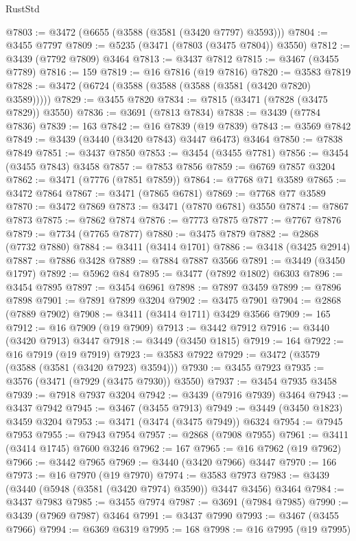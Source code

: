 \begin{lexlean}{RustStd}
\begin{coremodule}
{{{{{{{{{{{{{{{{{{{@7803 := @3472 (@6655 (@3588 (@3581 (@3420 @7797) @3593)))
@7804 := @3455 @7797
@7809 := @5235 (@3471 (@7803 (@3475 @7804)) @3550)
@7812 := @3439 (@7792 @7809) @3464
@7813 := @3437 @7812
@7815 := @3467 (@3455 @7789)
@7816 := 159
@7819 := @16 @7816 (@19 @7816)
@7820 := @3583 @7819
@7828 := @3472 (@6724 (@3588 (@3588 (@3588 (@3581 (@3420 @7820) @3589)))))
@7829 := @3455 @7820
@7834 := @7815 (@3471 (@7828 (@3475 @7829)) @3550)
@7836 := @3691 (@7813 @7834)
@7838 := @3439 (@7784 @7836)
@7839 := 163
@7842 := @16 @7839 (@19 @7839)
@7843 := @3569 @7842
@7849 := @3439 (@3440 (@3420 @7843) @3447 @6473) @3464
@7850 := @7838 @7849
@7851 := @3437 @7850
@7853 := @3454 (@3455 @7781)
@7856 := @3454 (@3455 @7843) @3458
@7857 := @7853 @7856
@7859 := @6769 @7857 @3204
@7862 := @3471 (@7776 (@7851 @7859))
@7864 := @7768 @71 @3589
@7865 := @3472 @7864
@7867 := @3471 (@7865 @6781)
@7869 := @7768 @77 @3589
@7870 := @3472 @7869
@7873 := @3471 (@7870 @6781) @3550
@7874 := @7867 @7873
@7875 := @7862 @7874
@7876 := @7773 @7875
@7877 := @7767 @7876
@7879 := @7734 (@7765 @7877)
@7880 := @3475 @7879
@7882 := @2868 (@7732 @7880)
@7884 := @3411 (@3414 @1701)
@7886 := @3418 (@3425 @2914)
@7887 := @7886 @3428
@7889 := @7884 @7887 @3566
@7891 := @3449 (@3450 @1797)
@7892 := @5962 @84
@7895 := @3477 (@7892 @1802) @6303
@7896 := @3454 @7895
@7897 := @3454 @6961
@7898 := @7897 @3459
@7899 := @7896 @7898
@7901 := @7891 @7899 @3204
@7902 := @3475 @7901
@7904 := @2868 (@7889 @7902)
@7908 := @3411 (@3414 @1711) @3429 @3566
@7909 := 165
@7912 := @16 @7909 (@19 @7909)
@7913 := @3442 @7912
@7916 := @3440 (@3420 @7913) @3447
@7918 := @3449 (@3450 @1815)
@7919 := 164
@7922 := @16 @7919 (@19 @7919)
@7923 := @3583 @7922
@7929 := @3472 (@3579 (@3588 (@3581 (@3420 @7923) @3594)))
@7930 := @3455 @7923
@7935 := @3576 (@3471 (@7929 (@3475 @7930)) @3550)
@7937 := @3454 @7935 @3458
@7939 := @7918 @7937 @3204
@7942 := @3439 (@7916 @7939) @3464
@7943 := @3437 @7942
@7945 := @3467 (@3455 @7913)
@7949 := @3449 (@3450 @1823) @3459 @3204
@7953 := @3471 (@3474 (@3475 @7949)) @6324
@7954 := @7945 @7953
@7955 := @7943 @7954
@7957 := @2868 (@7908 @7955)
@7961 := @3411 (@3414 @1745) @7600 @3246
@7962 := 167
@7965 := @16 @7962 (@19 @7962)
@7966 := @3442 @7965
@7969 := @3440 (@3420 @7966) @3447
@7970 := 166
@7973 := @16 @7970 (@19 @7970)
@7974 := @3583 @7973
@7983 := @3439 (@3440 (@5948 (@3581 (@3420 @7974) @3590)) @3447 @3456) @3464
@7984 := @3437 @7983
@7985 := @3455 @7974
@7987 := @3691 (@7984 @7985)
@7990 := @3439 (@7969 @7987) @3464
@7991 := @3437 @7990
@7993 := @3467 (@3455 @7966)
@7994 := @6369 @6319
@7995 := 168
@7998 := @16 @7995 (@19 @7995)
}}}}}}}}}}}}}}}}}}}
\end{coremodule}
\end{lexlean}
